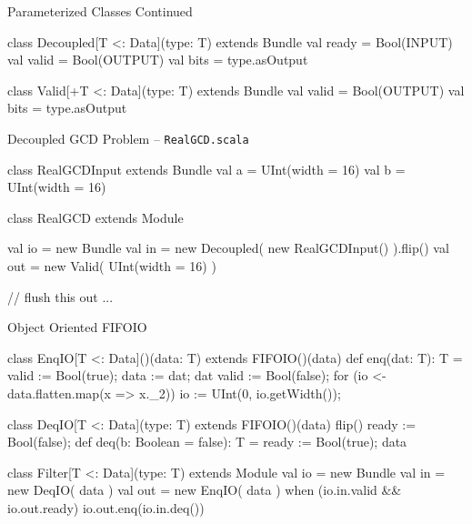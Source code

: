 \documentclass[xcolor=pdflatex,dvipsnames,table]{beamer}
\begin{document}
\begin{frame}[fragile]{Parameterized Classes Continued}
\begin{scala}
class Decoupled[T <: Data](type: T) extends Bundle {
  val ready = Bool(INPUT)
  val valid = Bool(OUTPUT)
  val bits  = type.asOutput
}

class Valid[+T <: Data](type: T) extends Bundle {
  val valid = Bool(OUTPUT)
  val bits  = type.asOutput
}
\end{scala}
\end{frame}

\begin{frame}[fragile]{Decoupled GCD Problem -- \tt RealGCD.scala}

\begin{scala}
class RealGCDInput extends Bundle {
  val a = UInt(width = 16)
  val b = UInt(width = 16)
}

class RealGCD extends Module {
  val io  = new Bundle {
    val in  = new Decoupled( new RealGCDInput() ).flip()
    val out = new Valid( UInt(width = 16) )
  }

  // flush this out ...
}
\end{scala}

\end{frame}


\begin{frame}[fragile]{Object Oriented FIFOIO}

{
\begin{scala}
class EnqIO[T <: Data]()(data: T) extends FIFOIO()(data) {
  def enq(dat: T): T = { valid := Bool(true); data := dat; dat }
  valid := Bool(false);
  for (io <- data.flatten.map(x => x._2))
    io := UInt(0, io.getWidth());
}

class DeqIO[T <: Data](type: T) extends FIFOIO()(data) {
  flip()
  ready := Bool(false);
  def deq(b: Boolean = false): T = { ready := Bool(true); data }
}

class Filter[T <: Data](type: T) extends Module {
  val io = new Bundle {
    val in  = new DeqIO( data )
    val out = new EnqIO( data )
  }
  when (io.in.valid && io.out.ready) {
    io.out.enq(io.in.deq())
  }
}
\end{scala}
}

\end{frame}
\end{document}
